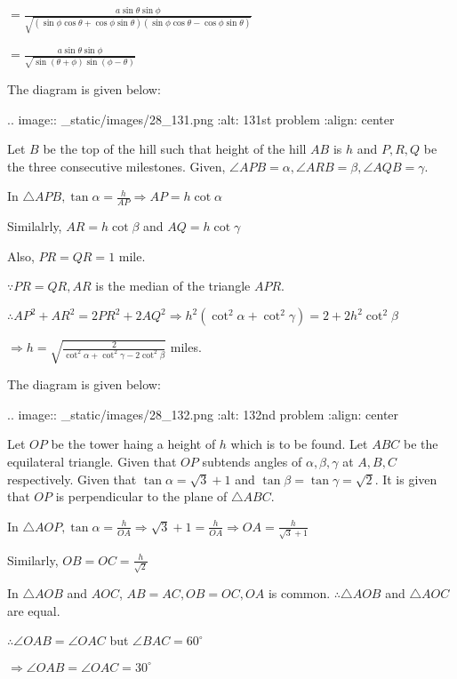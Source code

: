   $= \frac{a\sin\theta\sin\phi}{\sqrt{(\sin\phi\cos\theta +
      \cos\phi\sin\theta)(\sin\phi\cos\theta - \cos\phi\sin\theta)}}$

  $= \frac{a\sin\theta\sin\phi}{\sqrt{\sin(\theta + \phi)\sin(\phi - \theta)}}$

\item The diagram is given below:

  .. image:: _static/images/28_131.png
  :alt: 131st problem
  :align: center

  Let $B$ be the top of the hill such that height of the hill $AB$ is $h$ and $P,
  R, Q$ be the three consecutive milestones. Given, $\angle APB = \alpha, \angle ARB = \beta,
  \angle AQB = \gamma$.

  In $\triangle APB, \tan\alpha = \frac{h}{AP}\Rightarrow AP = h\cot\alpha$

  Similalrly, $AR = h\cot\beta$ and $AQ = h\cot\gamma$

  Also, $PR = QR = 1$ mile.

  $\because PR = QR, AR$ is the median of the triangle $APR$.

  $\therefore AP^2 + AR^2 = 2PR^2 + 2AQ^2 \Rightarrow h^2(\cot^2\alpha + \cot^2\gamma) = 2 +
  2h^2\cot^2\beta$

  $\Rightarrow h = \sqrt{\frac{2}{\cot^2\alpha + \cot^2\gamma - 2\cot^2\beta}}$ miles.

\item The diagram is given below:

  .. image:: _static/images/28_132.png
  :alt: 132nd problem
  :align: center

  Let $OP$ be the tower haing a height of $h$ which is to be found. Let $ABC$ be the
  equilateral triangle. Given that $OP$ subtends angles of $\alpha, \beta, \gamma$ at
  $A, B, C$ respectively. Given that $\tan\alpha = \sqrt{3} + 1$ and $\tan\beta =
  \tan\gamma = \sqrt{2}$. It is given that $OP$ is perpendicular to the plane of $\triangle
  ABC$.

  In $\triangle AOP, \tan\alpha = \frac{h}{OA} \Rightarrow \sqrt{3} + 1 = \frac{h}{OA} \Rightarrow
  OA = \frac{h}{\sqrt{3} + 1}$

  Similarly, $OB = OC = \frac{h}{\sqrt{2}}$

  In $\triangle AOB$ and $AOC$, $AB = AC, OB = OC, OA$ is common. $\therefore
  \triangle AOB$ and $\triangle AOC$ are equal.

  $\therefore \angle OAB = \angle OAC$ but $\angle BAC = 60^\circ$

  $\Rightarrow \angle OAB = \angle OAC = 30^\circ$


